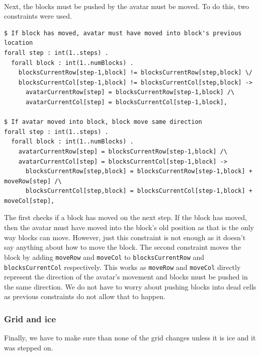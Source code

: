 \documentclass{article}
\newcommand{\n}[0]{\\[\baselineskip]}
\begin{document}
\n
Next, the blocks must be pushed by the avatar must be moved. To do this, two constraints were used.
\begin{lstlisting}[caption={Constraints for moving blocks}, captionpos=b]
$ If block has moved, avatar must have moved into block's previous location
forall step : int(1..steps) .
  forall block : int(1..numBlocks) .
    blocksCurrentRow[step-1,block] != blocksCurrentRow[step,block] \/
    blocksCurrentCol[step-1,block] != blocksCurrentCol[step,block] ->
      avatarCurrentRow[step] = blocksCurrentRow[step-1,block] /\
	  avatarCurrentCol[step] = blocksCurrentCol[step-1,block],

$ If avatar moved into block, block move same direction
forall step : int(1..steps) .
  forall block : int(1..numBlocks) .
    avatarCurrentRow[step] = blocksCurrentRow[step-1,block] /\
	avatarCurrentCol[step] = blocksCurrentCol[step-1,block] ->
	  blocksCurrentRow[step,block] = blocksCurrentRow[step-1,block] + moveRow[step] /\
	  blocksCurrentCol[step,block] = blocksCurrentCol[step-1,block] + moveCol[step],
\end{lstlisting}
The first checks if a block has moved on the next step. If the block has moved, then the avatar must have moved into the block's old position as that is the only way blocks can move. However, just this constraint is not enough as it doesn't say anything about how to move the block. The second constraint moves the block by adding \texttt{moveRow} and \texttt{moveCol} to \texttt{blocksCurrentRow} and \texttt{blocksCurrentCol} respectively. This works as \texttt{moveRow} and \texttt{moveCol} directly represent the direction of the avatar's movement and blocks must be pushed in the same direction. We do not have to worry about pushing blocks into dead cells as previous constraints do not allow that to happen. 


\subsubsection{Grid and ice}
Finally, we have to make sure than none of the grid changes unless it is ice and it was stepped on.
\end{document}
